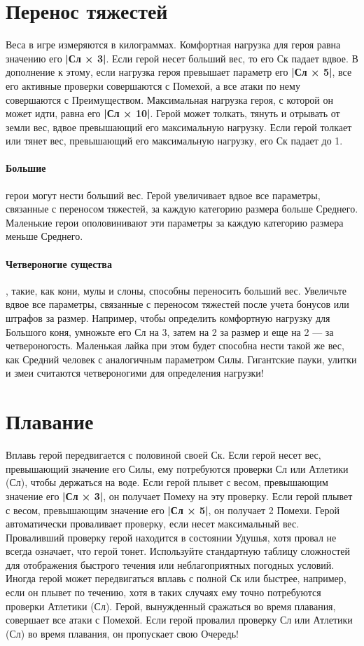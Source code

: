 



\section{Перенос тяжестей}
Веса в игре измеряются в килограммах. Комфортная нагрузка для героя равна значению его \textbf{|Сл × 3|}. Если герой несет больший вес, то его Ск падает вдвое. В дополнение к этому, если нагрузка героя превышает параметр его \textbf{|Сл × 5|}, все его активные проверки совершаются с Помехой, а все атаки по нему совершаются с Преимуществом. Максимальная нагрузка героя, с которой он может идти, равна его \textbf{|Сл × 10|}.
\newline
Герой может толкать, тянуть и отрывать от земли вес, вдвое превышающий его максимальную нагрузку. Если герой толкает или тянет вес, превышающий его максимальную нагрузку, его Ск падает до 1.
\paragraph{Большие} герои могут нести больший вес. Герой увеличивает вдвое все параметры, связанные с переносом тяжестей, за каждую категорию размера больше Среднего. Маленькие герои ополовинивают эти параметры за каждую категорию размера меньше Среднего.
\paragraph{Четвероногие существа}, такие, как кони, мулы и слоны, способны переносить больший вес. Увеличьте вдвое все параметры, связанные с переносом тяжестей после учета бонусов или штрафов за размер. Например, чтобы определить комфортную нагрузку для Большого коня, умножьте его Сл на 3, затем на 2 за размер и еще на 2 — за четвероногость. Маленькая лайка при этом будет способна нести такой же вес, как Средний человек с аналогичным параметром Силы. Гигантские пауки, улитки и змеи считаются четвероногими для определения нагрузки!
\section{Плавание}
Вплавь герой передвигается с половиной своей Ск. Если герой несет вес, превышающий значение его Силы, ему потребуются проверки Сл или Атлетики (Сл), чтобы держаться на воде. Если герой плывет с весом, превышающим значение его \textbf{|Сл × 3|}, он получает Помеху на эту проверку. Если герой плывет с весом, превышающим значение его \textbf{|Сл × 5|}, он получает 2 Помехи. Герой автоматически проваливает проверку, если несет максимальный вес. Проваливший проверку герой находится в состоянии Удушья, хотя провал не всегда означает, что герой тонет. Используйте стандартную таблицу сложностей для отображения быстрого течения или неблагоприятных погодных условий. Иногда герой может передвигаться вплавь с полной Ск или быстрее, например, если он плывет по течению, хотя в таких случаях ему точно потребуются проверки Атлетики (Сл).
\newline
Герой, вынужденный сражаться во время плавания, совершает все атаки с Помехой. Если герой провалил проверку Сл или Атлетики (Сл) во время плавания, он пропускает свою Очередь!
